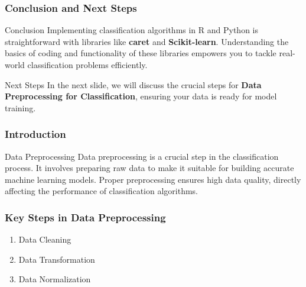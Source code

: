 \documentclass{beamer}
\begin{document}
\begin{frame}[fragile]
    \frametitle{Conclusion and Next Steps}
    \begin{block}{Conclusion}
        Implementing classification algorithms in R and Python is straightforward with libraries like \textbf{caret} and \textbf{Scikit-learn}. Understanding the basics of coding and functionality of these libraries empowers you to tackle real-world classification problems efficiently.
    \end{block}

    \begin{block}{Next Steps}
        In the next slide, we will discuss the crucial steps for \textbf{Data Preprocessing for Classification}, ensuring your data is ready for model training.
    \end{block}
\end{frame}

\begin{frame}
    \titlepage
\end{frame}

\begin{frame}
    \frametitle{Introduction}
    \begin{block}{Data Preprocessing}
        Data preprocessing is a crucial step in the classification process. 
        It involves preparing raw data to make it suitable for building accurate machine learning models. 
        Proper preprocessing ensures high data quality, directly affecting the performance of classification algorithms.
    \end{block}
\end{frame}

\begin{frame}
    \frametitle{Key Steps in Data Preprocessing}
    \begin{enumerate}
        \item Data Cleaning
        \item Data Transformation
        \item Data Normalization
    \end{enumerate}
\end{frame}
\end{document}
